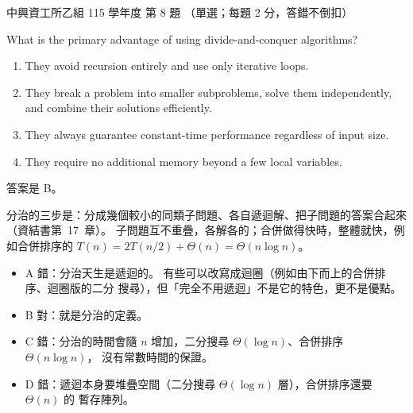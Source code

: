 \begin{pastexam}[label={px:nchu-115-is-08}]{中興資工所乙組 115 學年度 第 8 題}
（單選；每題 2 分，答錯不倒扣）

What is the primary advantage of using divide-and-conquer algorithms?
\begin{enumerate}[label=\Alph*.,nosep]
\item They avoid recursion entirely and use only iterative loops.
\item They break a problem into smaller subproblems, solve them independently, and combine their
solutions efficiently.
\item They always guarantee constant-time performance regardless of input size.
\item They require no additional memory beyond a few local variables.
\end{enumerate}
\end{pastexam}

\begin{pastsoln}
答案是 B。

分治的三步是：分成幾個較小的同類子問題、各自遞迴解、把子問題的答案合起來（資結書第~17~章）。
子問題互不重疊，各解各的；合併做得快時，整體就快，例如合併排序的
$T(n) = 2T(n/2) + \Theta(n) = \Theta(n \log n)$。
\begin{itemize}
\item A 錯：分治天生是遞迴的。 有些可以改寫成迴圈（例如由下而上的合併排序、迴圈版的二分
搜尋），但「完全不用遞迴」不是它的特色，更不是優點。
\item B 對：就是分治的定義。
\item C 錯：分治的時間會隨 $n$ 增加，二分搜尋 $\Theta(\log n)$、合併排序 $\Theta(n \log n)$，
沒有常數時間的保證。
\item D 錯：遞迴本身要堆疊空間（二分搜尋 $\Theta(\log n)$ 層），合併排序還要 $\Theta(n)$ 的
暫存陣列。
\end{itemize}
\end{pastsoln}
